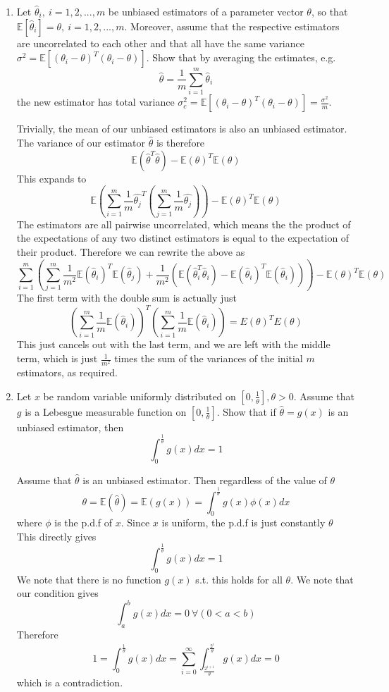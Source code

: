 \documentclass{article}
\newcommand{\chapternumber}{3}
\newenvironment{QandA}{\begin{enumerate}[label=\chapternumber.\arabic*]\bfseries\boldmath}
	{\end{enumerate}}
\newenvironment{answered}{\par\bigskip\normalfont\unboldmath}{}
\begin{document}
\begin{QandA}
\begin{answered}
		\end{answered}
		\item Let $\hat{\theta}_i,\ i=1,2,...,m$ be unbiased estimators of a parameter vector $\theta$, so that $\mathbb{E}[\hat{\theta}_i]=\theta,\ i=1,2,...,m$. Moreover, assume that the respective estimators are uncorrelated to each other and that all have the same variance $\sigma^2=\mathbb{E}[(\theta_i-\theta)^T(\theta_i-\theta)]$. Show that by averaging the estimates, e.g.
		\[\hat{\theta}=\frac{1}{m}\sum_{i=1}^{m}\hat{\theta}_i\]
		the new estimator has total variance $\sigma_c^2=\mathbb{E}[(\theta_i-\theta)^T(\theta_i-\theta)]=\frac{\sigma^2}{m}$.
		\begin{answered}
			Trivially, the mean of our unbiased estimators is also an unbiased estimator. The variance of our estimator $\hat{\theta}$ is therefore
			\[\mathbb{E}(\hat{\theta}^T\hat{\theta})-\mathbb{E}(\theta)^T\mathbb{E}(\theta)\]
			This expands to
			\[\mathbb{E}\left(\sum_{i=1}^m\frac{1}{m}\hat{\theta_j}^T\left(\sum_{j=1}^m\frac{1}{m}\hat{\theta_j}\right)\right)-\mathbb{E}(\theta)^T\mathbb{E}(\theta)\]
			The estimators are all pairwise uncorrelated, which means the the product of the expectations of any two distinct estimators is equal to the expectation of their product. Therefore we can rewrite the above as
			\[\sum_{i=1}^m\left(\sum_{j=1}^m\frac{1}{m^2}\mathbb{E}(\hat{\theta}_i)^T\mathbb{E}(\hat{\theta}_j)+\frac{1}{m^2}(\mathbb{E}(\hat{\theta}_i^T\hat{\theta}_i)-\mathbb{E}(\hat{\theta}_i)^T\mathbb{E}(\hat{\theta}_i))\right) - \mathbb{E}(\theta)^T\mathbb{E}(\theta)\]
			The first term with the double sum is actually just
			\[\left( \sum_{i=1}^m\frac{1}{m}\mathbb{E}(\hat{\theta}_i)\right)^T\left( \sum_{i=1}^m\frac{1}{m}\mathbb{E}(\hat{\theta}_i)\right) = E(\theta)^TE(\theta)\]
			This just cancels out with the last term, and we are left with the middle term, which is just $\frac{1}{m^2}$ times the sum of the variances of the initial $m$ estimators, as required.
			
		\end{answered}	
	
		\item Let $x$ be random variable uniformly distributed on $[0,\frac{1}{\theta}],\theta>0$. Assume that $g$ is a Lebesgue measurable function on $[0,\frac{1}{\theta}]$. Show that if $\hat{\theta}=g(x)$ is an unbiased estimator, then
		\[\int_0^\frac{1}{\theta}g(x)dx=1\]
		\begin{answered}
			Assume that $\hat{\theta}$ is an unbiased estimator. Then regardless of the value of $\theta$
			\[\theta=\mathbb{E}(\hat{\theta})=\mathbb{E}(g(x))=\int_0^\frac{1}{\theta}g(x)\phi(x)dx\]
			where $\phi$ is the p.d.f of $x$. Since $x$ is uniform, the p.d.f is just constantly $\theta$ This directly gives 
			\[\int_0^\frac{1}{\theta}g(x)dx=1\] We note that there is no function $g(x)$ s.t. this holds for all $\theta$. We note that our condition gives 
			\[\int_a^bg(x)dx=0\ \forall (0<a<b)\] Therefore
			\[1=\int_0^\frac{1}{\theta}g(x)dx=\sum_{i=0}^\infty\int_\frac{2^{i+1}}{\theta}^\frac{2^i}{\theta}g(x)dx=0 \]
			which is a contradiction.
		\end{answered}
	

\end{QandA}
\end{document}
